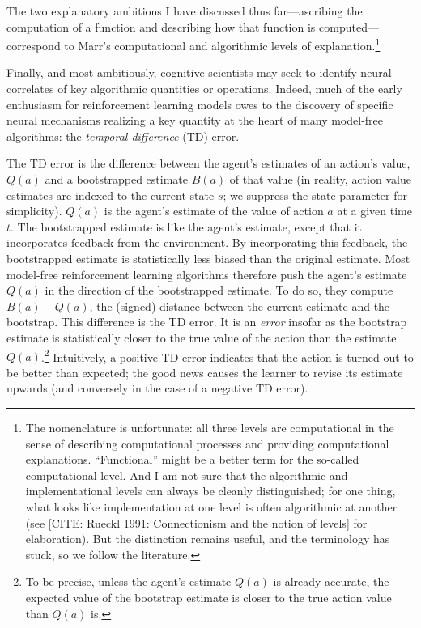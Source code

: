 The two explanatory ambitions I have discussed thus far---ascribing the computation of a function and describing how that function is computed---correspond to Marr's computational and algorithmic levels of explanation.\footnote{The nomenclature is unfortunate: all three levels are computational in the sense of describing computational processes and providing computational explanations.
``Functional'' might be a better term for the so-called computational level.
And I am not sure that the algorithmic and implementational levels can always be cleanly distinguished; for one thing, what looks like implementation at one level is often algorithmic at another (see [CITE: Rueckl 1991: Connectionism and the notion of levels] for elaboration).
But the distinction remains useful, and the terminology has stuck, so we follow the literature.}

Finally, and most ambitiously, cognitive scientists may seek to identify neural correlates of key algorithmic quantities or operations.
Indeed, much of the early enthusiasm for reinforcement learning models owes to the discovery of specific neural mechanisms realizing a key quantity at the heart of many model-free algorithms: the \emph{temporal difference} (TD) error.

The TD error is the difference between the agent's estimates of an action's value, $Q(a)$ and a bootstrapped estimate $B(a)$ of that value (in reality, action value estimates are indexed to the current state $s$; we suppress the state parameter for simplicity).
$Q(a)$ is the agent's estimate of the value of action $a$ at a given time $t$.
The bootstrapped estimate is like the agent's estimate, except that it incorporates feedback from the environment.
By incorporating this feedback, the bootstrapped estimate is statistically less biased than the original estimate.
Most model-free reinforcement learning algorithms therefore push the agent's estimate $Q(a)$ in the direction of the bootstrapped estimate.
To do so, they compute $B(a) - Q(a)$, the (signed) distance between the current estimate and the bootstrap.
This difference is the TD error.
It is an \emph{error} insofar as the bootstrap estimate is statistically closer to the true value of the action than the estimate $Q(a)$.\footnote{To be precise, unless the agent's estimate $Q(a)$ is already accurate, the expected value of the bootstrap estimate is closer to the true action value than $Q(a)$ is.}
Intuitively, a positive TD error indicates that the action is turned out to be better than expected; the good news causes the learner to revise its estimate upwards (and conversely in the case of a negative TD error).

